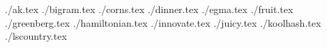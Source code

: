 \documentclass[11pt,letterpaper,oneside]{article}
\newcommand{\importproblem}[2]{{./#2.tex}}
\begin{document}
\importproblem{a}{ak}
\importproblem{b}{bigram}
\importproblem{c}{corns}
\importproblem{d}{dinner}
\importproblem{e}{egma}
\importproblem{f}{fruit}
\importproblem{g}{greenberg}
\importproblem{h}{hamiltonian}
\importproblem{i}{innovate}
\importproblem{j}{juicy}
\importproblem{k}{koolhash}
\importproblem{l}{lscountry}
\end{document}

